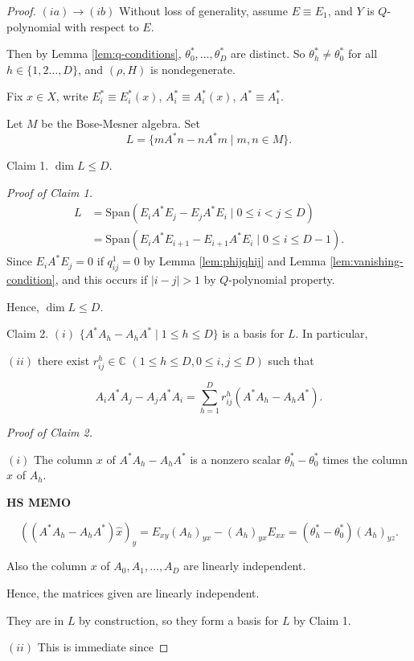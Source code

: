 \documentclass[
]{book}
\theoremstyle{definition}
\theoremstyle{definition}
\theoremstyle{definition}
\theoremstyle{definition}
\theoremstyle{remark}
\begin{document}
\begin{proof}
\leavevmode

\((ia)\to(ib)\) Without loss of generality, assume \(E \equiv E_1\), and \(Y\) is \(Q\)-polynomial with respect to \(E\).

Then by Lemma \ref{lem:q-conditions},
\(\theta_0^*, \ldots, \theta^*_D\) are distinct. So \(\theta^*_h\neq \theta^*_0\) for all \(h\in \{1,2\ldots, D\}\), and \((\rho, H)\) is nondegenerate.

Fix \(x\in X\), write \(E^*_i\equiv E^*_i(x)\), \(A^*_i \equiv A^*_i(x)\), \(A^* \equiv A_1^*\).

Let \(M\) be the Bose-Mesner algebra. Set
\[L = \{mA^*n - nA^*m\mid m, n\in M\}.\]

Claim 1. \(\dim L \leq D\).

\emph{Proof of Claim 1.}
\begin{align}
L & = \mathrm{Span}(E_iA^*E_j - E_jA^*E_i \mid 0\leq i<j\leq D)\\
& = \mathrm{Span}(E_iA^*E_{i+1} - E_{i+1}A^*E_i \mid 0\leq i\leq D-1).
\end{align}
Since \(E_iA^*E_j = 0\) if \(q^1_{ij} = 0\) by Lemma \ref{lem:phijqhij} and Lemma \ref{lem:vanishing-condition},
and this occurs if \(|i-j|>1\) by \(Q\)-polynomial property.

Hence, \(\dim L \leq D\).

Claim 2. \((i)\) \(\{A^*A_h - A_hA^*\mid 1\leq h\leq D\}\) is a basis for \(L\). In particular,

\((ii)\) there exist \(r^h_{ij}\in \mathbb{C}\) \((1\leq h\leq D, 0\leq i,j\leq D)\) such that

\[A_iA^*A_j - A_jA^*A_i = \sum_{h=1}^D r^h_{ij}(A^*A_h - A_hA^*).\]

\emph{Proof of Claim 2.}

\((i)\) The column \(x\) of \(A^*A_h - A_hA^*\) is a nonzero scalar \(\theta^*_h - \theta^*_0\) times the column \(x\) of \(A_h\).

\textbf{HS MEMO}

\[ ((A^*A_h - A_hA^*)\hat{x})_y = E_{xy}(A_h)_{yx}- (A_h)_{yx}E_{xx} = (\theta^*_h-\theta^*_0)(A_h)_{yz}.\]

Also the column \(x\) of \(A_0, A_1, \ldots, A_D\) are linearly independent.

Hence, the matrices given are linearly independent.

They are in \(L\) by construction, so they form a basis for \(L\) by Claim 1.

\((ii)\) This is immediate since


\end{proof}
\end{document}
